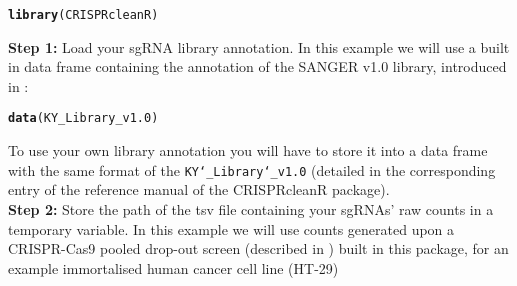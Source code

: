\documentclass{article}\usepackage[]{graphicx}\usepackage[]{color}
\makeatletter
\newcommand{\hlstd}[1]{\textcolor[rgb]{0.345,0.345,0.345}{#1}}%
\newcommand{\hlkwd}[1]{\textcolor[rgb]{0.737,0.353,0.396}{\textbf{#1}}}%
\newenvironment{kframe}{%
 \def\at@end@of@kframe{}%
 \ifinner\ifhmode%
  \def\at@end@of@kframe{\end{minipage}}%
  \begin{minipage}{\columnwidth}%
 \fi\fi%
 \def\FrameCommand##1{\hskip\@totalleftmargin \hskip-\fboxsep
 \colorbox{shadecolor}{##1}\hskip-\fboxsep
     \hskip-\linewidth \hskip-\@totalleftmargin \hskip\columnwidth}%
 \MakeFramed {\advance\hsize-\width
   \@totalleftmargin\z@ \linewidth\hsize
   \@setminipage}}%
 {\par\unskip\endMakeFramed%
 \at@end@of@kframe}
\newenvironment{knitrout}{}{} %
\makeatother
\begin{document}
 
\begin{knitrout}
\color{fgcolor}\begin{kframe}
\begin{alltt}
    \hlkwd{library}\hlstd{(CRISPRcleanR)}
\end{alltt}


{\ttfamily\noindent\itshape\color{messagecolor}{\#\# Loading required package: stringr}}

{\ttfamily\noindent\itshape\color{messagecolor}{\#\# Loading required package: DNAcopy}}

{\ttfamily\noindent\itshape\color{messagecolor}{\#\# Loading required package: pROC}}

{\ttfamily\noindent\itshape{}}

{\ttfamily\noindent\itshape\color{messagecolor}{\#\# \\\#\# Attaching package: 'pROC'}}

{\ttfamily\noindent\itshape\color{messagecolor}{\#\# The following objects are masked from 'package:stats':\\\#\# \\\#\#\ \ \ \  cov, smooth, var}}

{\ttfamily\noindent\itshape\color{messagecolor}{\#\# Loading required package: pracma}}\end{kframe}
\end{knitrout}


% 
\textbf{Step 1:} Load your sgRNA library annotation. In this example we will use a built in data frame containing the annotation of the SANGER v1.0 library, introduced in \cite{Tzelepis:2016ix}:
\begin{knitrout}
\color{fgcolor}\begin{kframe}
\begin{alltt}
\hlkwd{data}\hlstd{(KY_Library_v1.0)}
\end{alltt}
\end{kframe}
\end{knitrout}
% 
To use your own library annotation you will have to store it into a data frame with the same format of the \texttt{KY\char`_Library\char`_v1.0} (detailed in the corresponding entry of the reference manual of the CRISPRcleanR package).\\

\textbf{Step 2:} Store the path of the tsv file containing your sgRNAs' raw counts in a temporary variable. In this example we will use counts generated upon a CRISPR-Cas9 pooled drop-out screen (described in \cite{Iorio:2017}) built in this package, for an example immortalised human cancer cell line (HT-29)
\end{document}
